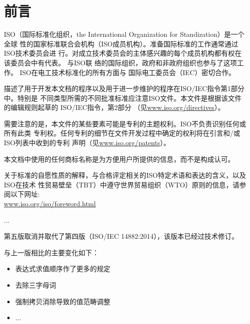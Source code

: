 \chapter*{前言}

ISO（国际标准化组织，the International Organization for Standization）是一个全球
性的国家标准联合会机构（ISO成员机构）。准备国际标准的工作通常通过ISO技术委员会进
行。对成立技术委员会的主体感兴趣的每个成员机构都有权在该委员会中有代表。 与ISO联
络的国际组织，政府和非政府组织也参与了这项工作。 ISO在电工技术标准化的所有方面与
国际电工委员会（IEC）密切合作。

描述了用于开发本文档的程序以及用于进一步维护的程序在ISO/IEC指令第1部分中。特别是
不同类型所需的不同批准标准应注意ISO文件。本文件是根据该文件的编辑规则起草的
ISO/IEC指令，第2部分
（见\href{https://www.iso.org/directives}{www.iso.org/directives}）。

需要注意的是，本文件的某些要素可能是专利的主题权利。ISO不负责识别任何或所有此类
专利权。任何专利的细节在文件开发过程中确定的权利将在引言和/或ISO列表中收到的专利
声明（见\href{https://www.iso.org/patents}{www.iso.org/patents}）。

本文档中使用的任何商标名称是为方便用户所提供的信息，而不是构成认可。

关于标准的自愿性质的解释，与合格评定相关的ISO特定术语和表达的含义，以及ISO在技术
性贸易壁垒（TBT）中遵守世界贸易组织（WTO）原则的信息，请参阅以下网址: \\
\href{www.iso.org/iso/foreword.html}{www.iso.org/iso/foreword.html}

...

第五版取消并取代了第四版（ISO/IEC 14882:2014），该版本已经过技术修订。

与上一版相比的主要变化如下：
\begin{itemize}
  \item 表达式求值顺序作了更多的规定
  \item 去除三字母词
  \item 强制拷贝消除导致的值范畴调整
  \item ...
\end{itemize}

